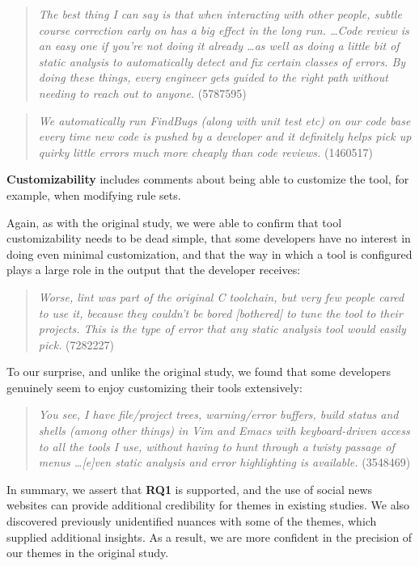 \documentclass{sig-alternate}
\begin{document}
\begin{quote}
\textit{The best thing I can say is that when interacting with other people, subtle course correction early on has a big effect in the long run. \ldots Code review is an easy one if you're not doing it already \ldots  as well as doing a little bit of static analysis to automatically detect and fix certain classes of errors. By doing these things, every engineer gets guided to the right path without needing to reach out to anyone.} (5787595)
\end{quote}

\begin{quote}
\textit{We automatically run FindBugs (along with unit test etc) on our code base every time new code is pushed by a developer and it definitely helps pick up quirky little errors much more cheaply than code reviews.} (1460517)
\end{quote}

\textbf{Customizability} includes comments about being able to customize the tool, for example, when modifying rule sets.

Again, as with the original study, we were able to confirm that tool customizability needs to be dead simple, that some developers have no interest in doing even minimal customization, and that the way in which a tool is configured plays a large role in the output that the developer receives:

\begin{quote}
\textit{Worse, lint was part of the original C toolchain, but very few people cared to use it, because they couldn't be bored [bothered] to tune the tool to their projects. This is the type of error that any static analysis tool would easily pick.} (7282227)
\end{quote}

To our surprise, and unlike the original study, we found that some developers genuinely seem to enjoy customizing their tools extensively:

\begin{quote}
\textit{You see, I have file/project trees, warning/error buffers, build status and shells (among other things) in Vim and Emacs with keyboard-driven access to all the tools I use, without having to hunt through a twisty passage of menus \ldots [e]ven static analysis and error highlighting is available.} (3548469)
\end{quote}

In summary, we assert that \textbf{RQ1} is supported, and the use of social news websites can provide additional credibility for themes in existing studies. We also discovered previously unidentified nuances with some of the themes, which supplied additional insights. As a result, we are more confident in the precision of our themes in the original study.
\end{document}

